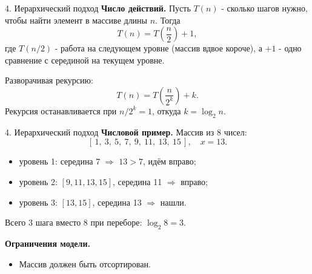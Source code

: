 \documentclass{beamer}
\begin{document}
    \begin{frame}{4. Иерархический подход}
        \textbf{Число действий.} Пусть $T(n)$ - сколько шагов нужно,
        чтобы найти элемент в массиве длины $n$. Тогда
        \[
            T(n) = T\!\left(\frac{n}{2}\right) + 1,
        \]
        где $T(n/2)$ - работа на следующем уровне (массив вдвое короче),
        а $+1$ - одно сравнение с серединой на текущем уровне.

        \medskip
        Разворачивая рекурсию:
        \[
            T(n) = T\!\left(\frac{n}{2^k}\right) + k.
        \]
        Рекурсия останавливается при $n/2^k = 1$, откуда $k = \log_2 n$. 
    \end{frame}

    \begin{frame}{4. Иерархический подход}
        \textbf{Числовой пример.} Массив из 8 чисел:
        \[
            [\,1,\ 3,\ 5,\ 7,\ 9,\ 11,\ 13,\ 15\,], \quad x = 13.
        \]
        \begin{itemize}
            \item уровень 1: середина 7 $\Rightarrow$ $13 > 7$, идём вправо;
            \item уровень 2: $[9, 11, 13, 15]$, середина 11 $\Rightarrow$ вправо;
            \item уровень 3: $[13, 15]$, середина 13 $\Rightarrow$ нашли.
        \end{itemize}
        Всего 3 шага вместо 8 при переборе: $\log_2 8 = 3$.

        \medskip
        \textbf{Ограничения модели.}
        \begin{itemize}
            \item Массив должен быть отсортирован.
        \end{itemize}
    \end{frame}
\end{document}
